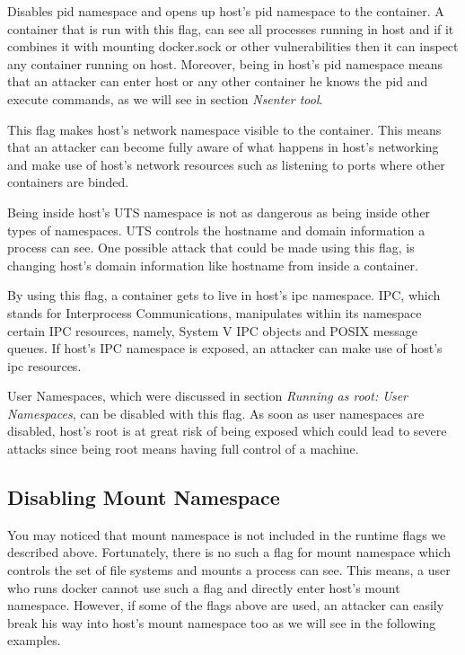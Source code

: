 \begin{description}[style=nextline]
\item[--pid=host:]
Disables pid namespace and opens up host's pid namespace to the container. A container that is run with this flag, can see all processes running in host and if it combines it with mounting docker.sock or other vulnerabilities then it can inspect any container running on host. Moreover, being in host's pid namespace means that an attacker can enter host or any other container he knows the pid and execute commands, as we will see in section \textit{Nsenter tool}.

\item[--net=host:]
This flag makes host's network namespace visible to the container. This means that an attacker can become fully aware of what happens in host's networking and make use of host's network resources such as listening to ports where other containers are binded.

\item[--uts=host:]
Being inside host's UTS namespace is not as dangerous as being inside other types of namespaces. UTS controls the hostname and domain information a process can see. One possible attack that could be made using this flag, is changing host's domain information like hostname from inside a container.

\item[--ipc=host:]
By using this flag, a container gets to live in host's ipc namespace. IPC, which stands for Interprocess Communications, manipulates within its namespace certain IPC resources, namely, System V IPC objects and POSIX message queues. If host's IPC namespace is exposed, an attacker can make use of host's ipc resources.

\item[--userns=host:]
User Namespaces, which were discussed in section \textit{Running as root: User Namespaces}, can be disabled with this flag. As soon as user namespaces are disabled, host's root is at great risk of being exposed which could lead to severe attacks since being root means having full control of a machine.
\end{description}

\subsection{Disabling Mount Namespace}

You may noticed that mount namespace is not included in the runtime flags we described above. Fortunately, there is no such a flag for mount namespace which controls the set of file systems and mounts a process can see. This means, a user who runs docker cannot use such a flag and directly enter host's mount namespace. However, if some of the flags above are used, an attacker can easily break his way into host's mount namespace too as we will see in the following examples.

